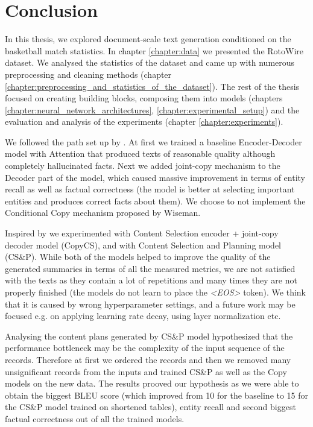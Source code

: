 \chapter*{Conclusion}

In this thesis, we explored document-scale text generation conditioned on the basketball match statistics. In chapter \ref{chapter:data} we presented the RotoWire dataset. We analysed the statistics of the dataset and came up with numerous preprocessing and cleaning methods (chapter \ref{chapter:preprocessing_and_statistics_of_the_dataset}). The rest of the thesis focused on creating building blocks, composing them into models (chapters \ref{chapter:neural_network_architectures}, \ref{chapter:experimental_setup}) and the evaluation and analysis of the experiments (chapter \ref{chapter:experiments}).

We followed the path set up by \citet{wiseman2017}. At first we trained a baseline Encoder-Decoder model with Attention that produced texts of reasonable quality although completely hallucinated facts. Next we added joint-copy mechanism to the Decoder part of the model, which caused massive improvement in terms of entity recall as well as factual correctness (the model is better at selecting important entities and produces correct facts about them). We choose to not implement the Conditional Copy mechanism proposed by Wiseman.

Inspired by \citet{puduppully2019datatotext} we experimented with Content Selection encoder + joint-copy decoder model (CopyCS), and with Content Selection and Planning model (CS\&P). While both of the models helped to improve the quality of the generated summaries in terms of all the measured metrics, we are not satisfied with the texts as they contain a lot of repetitions and many times they are not properly finished (the models do not learn to place the \emph{\textless EOS\textgreater} token). We think that it is caused by wrong hyperparameter settings, and a future work may be focused e.g. on applying learning rate decay, using layer normalization etc.

Analysing the content plans generated by CS\&P model hypothesized that the performance bottleneck may be the complexity of the input sequence of the records. Therefore at first we ordered the records and then we removed many unsignificant records from the inputs and trained CS\&P as well as the Copy models on the new data. The results prooved our hypothesis as we were able to obtain the biggest BLEU score (which improved from 10 for the baseline to 15 for the CS\&P model trained on shortened tables), entity recall and second biggest factual correctness out of all the trained models.

